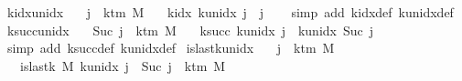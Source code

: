 \begin{isabellebody}
\endisatagproof
{\isafoldproof}%
%
\isadelimproof
\isanewline
%
\endisadelimproof
\isanewline
{}\isamarkupfalse%
\ k{\isacharunderscore}{\kern0pt}idx{\isacharunderscore}{\kern0pt}unidx{\isacharcolon}{\kern0pt}\isanewline
\ \ \ {\isachardoublequoteopen}j\ {\isacharless}{\kern0pt}\ k{\isacharunderscore}{\kern0pt}tm\ M{\isachardoublequoteclose}\isanewline
\ \ \ {\isachardoublequoteopen}k{\isacharunderscore}{\kern0pt}idx\ {\isacharparenleft}{\kern0pt}k{\isacharunderscore}{\kern0pt}unidx\ j{\isacharparenright}{\kern0pt}\ {\isacharequal}{\kern0pt}\ j{\isachardoublequoteclose}\isanewline
%
\isadelimproof
\ \ %
\endisadelimproof
%
\isatagproof
{}\isamarkupfalse%
\ {\isacharparenleft}{\kern0pt}simp\ add{\isacharcolon}{\kern0pt}\ k{\isacharunderscore}{\kern0pt}idx{\isacharunderscore}{\kern0pt}def\ k{\isacharunderscore}{\kern0pt}unidx{\isacharunderscore}{\kern0pt}def{\isacharparenright}{\kern0pt}%
\endisatagproof
{\isafoldproof}%
%
\isadelimproof
\isanewline
%
\endisadelimproof
\isanewline
{}\isamarkupfalse%
\ k{\isacharunderscore}{\kern0pt}succ{\isacharunderscore}{\kern0pt}unidx{\isacharcolon}{\kern0pt}\isanewline
\ \ \ {\isachardoublequoteopen}Suc\ j\ {\isacharless}{\kern0pt}\ k{\isacharunderscore}{\kern0pt}tm\ M{\isachardoublequoteclose}\isanewline
\ \ \ {\isachardoublequoteopen}k{\isacharunderscore}{\kern0pt}succ\ {\isacharparenleft}{\kern0pt}k{\isacharunderscore}{\kern0pt}unidx\ j{\isacharparenright}{\kern0pt}\ {\isacharequal}{\kern0pt}\ k{\isacharunderscore}{\kern0pt}unidx\ {\isacharparenleft}{\kern0pt}Suc\ j{\isacharparenright}{\kern0pt}{\isachardoublequoteclose}\isanewline
%
\isadelimproof
\ \ %
\endisadelimproof
%
\isatagproof
{}\isamarkupfalse%
\ {\isacharparenleft}{\kern0pt}simp\ add{\isacharcolon}{\kern0pt}\ k{\isacharunderscore}{\kern0pt}succ{\isacharunderscore}{\kern0pt}def\ k{\isacharunderscore}{\kern0pt}unidx{\isacharunderscore}{\kern0pt}def{\isacharparenright}{\kern0pt}%
\endisatagproof
{\isafoldproof}%
%
\isadelimproof
\isanewline
%
\endisadelimproof
\isanewline
{}\isamarkupfalse%
\ is{\isacharunderscore}{\kern0pt}last{\isacharunderscore}{\kern0pt}k{\isacharunderscore}{\kern0pt}unidx{\isacharcolon}{\kern0pt}\isanewline
\ \ \ {\isachardoublequoteopen}j\ {\isacharless}{\kern0pt}\ k{\isacharunderscore}{\kern0pt}tm\ M{\isachardoublequoteclose}\isanewline
\ \ \ {\isachardoublequoteopen}is{\isacharunderscore}{\kern0pt}last{\isacharunderscore}{\kern0pt}k\ M\ {\isacharparenleft}{\kern0pt}k{\isacharunderscore}{\kern0pt}unidx\ j{\isacharparenright}{\kern0pt}\ {\isasymlongleftrightarrow}\ Suc\ j\ {\isacharequal}{\kern0pt}\ k{\isacharunderscore}{\kern0pt}tm\ M{\isachardoublequoteclose}\isanewline

\end{isabellebody}
